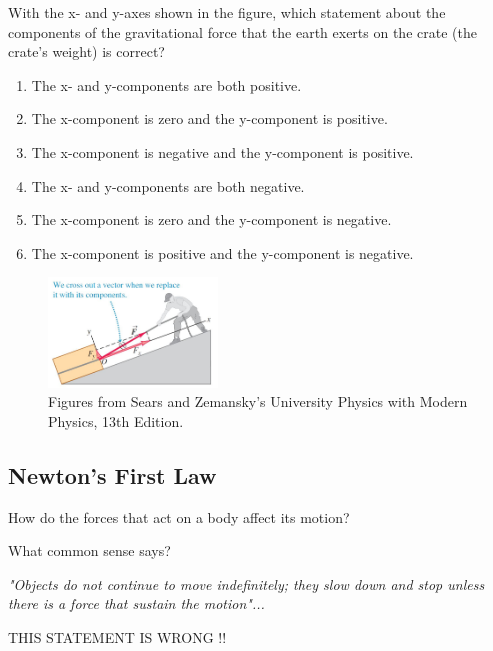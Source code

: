 \documentclass[]{beamer}
\begin{document}
 \begin{frame}

 With the x- and y-axes shown in the figure, which statement
 about the components of the gravitational force that the earth exerts on the crate
 (the crate’s weight) is correct? 
 \vspace{3mm}

\begin{enumerate}
  \item The x- and y-components are both positive.
  \item The x-component is zero and the y-component is positive.
  \item The x-component is negative   and the y-component is positive.
  \item The x- and y-components are both negative.
  \item The x-component is zero and the y-component is negative.
  \item The x-component is   positive and the y-component is negative.
\end{enumerate}


 \begin{figure}[h!]  
  \includegraphics[width=0.4\textwidth]{images/f9.jpg}
  \caption{ {\tiny Figures from Sears and Zemansky's University Physics 
  with Modern Physics, 13th Edition.} }
\end{figure}


\end{frame}


\subsection{Newton's First Law}
 \begin{frame}

How do the forces that act on a body affect its motion?
 \pause

 \vspace{5mm}
What common sense says? 
\pause

\vspace{5mm}

\textit{"Objects do not continue to move indefinitely; they slow
down and stop unless there is a force that sustain the motion"...}

\vspace{5mm}
\pause
THIS STATEMENT IS WRONG !!
 
 \end{frame}
\end{document}
